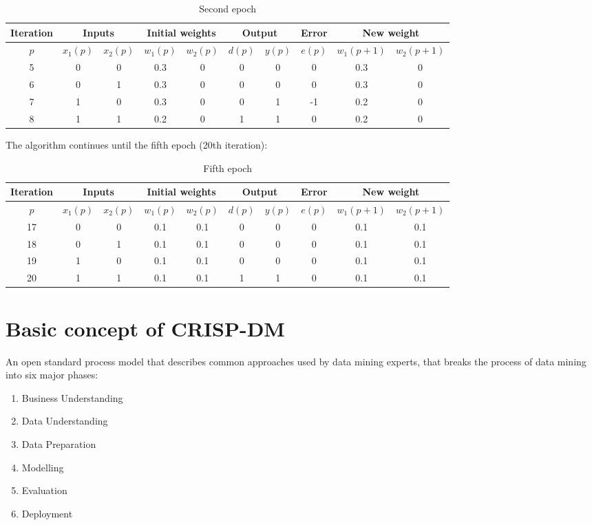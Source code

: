 \documentclass[a4paper,12pt,answers]{article}
\begin{document}
	\begin{table}[H]
		\centering
		\begin{tabular}{|c|c|c|c|c|c|c|c|c|c|}
			\hline
			Iteration & \multicolumn{2}{c|}{Inputs} & \multicolumn{2}{c|}{Initial weights} & \multicolumn{2}{c|}{Output} & Error & \multicolumn{2}{c|}{New weight} \\
			\hline
			$p$ & $x_1(p)$ & $x_2(p)$ & $w_1(p)$ & $w_2(p)$ &$d(p)$ & $y(p)$ & $e(p)$ & $w_1(p+1)$ & $w_2(p+1)$ \\ \hline
			5 & 0 & 0 & 0.3 & 0    & 0 & 0 & 0 & 0.3 & 0 \\
			6 & 0 & 1 & 0.3 & 0 & 0 & 0 & 0 & 0.3 & 0 \\
			7 & 1 & 0 & 0.3 & 0 & 0 & 1 & -1& 0.2 & 0 \\
			8 & 1 & 1 & 0.2 & 0 & 1 & 1 & 0 & 0.2 &  0 \\
			\hline
		\end{tabular}
		\caption{Second epoch}
	\end{table}
	\newpage
	\noindent
	The algorithm continues until the fifth epoch (20th iteration):
	\begin{table}[H]
		\centering
		\begin{tabular}{|c|c|c|c|c|c|c|c|c|c|}
			\hline
			Iteration & \multicolumn{2}{c|}{Inputs} & \multicolumn{2}{c|}{Initial weights} & \multicolumn{2}{c|}{Output} & Error & \multicolumn{2}{c|}{New weight} \\
			\hline
			$p$ & $x_1(p)$ & $x_2(p)$ & $w_1(p)$ & $w_2(p)$ &$d(p)$ & $y(p)$ & $e(p)$ & $w_1(p+1)$ & $w_2(p+1)$ \\ \hline
			17  & 0        & 0        & 0.1 & 0.1    & 0 & 0 & 0 & 0.1 & 0.1 \\
			18  & 0        & 1        & 0.1  & 0.1 & 0 & 0 & 0 & 0.1 & 0.1 \\
			19  & 1        & 0        & 0.1 & 0.1 & 0 & 0 & 0 & 0.1 & 0.1 \\
			20  & 1        & 1        & 0.1 & 0.1 & 1 & 1 & 0 & 0.1 & 0.1 \\
			\hline
		\end{tabular}
		\caption{Fifth epoch}
	\end{table}
	
	
	
	\newpage
	\section{Basic concept of CRISP-DM}
	An open standard process model that describes common approaches used by data mining experts, that breaks the process of data mining into six major phases:
	\begin{enumerate}
		\item Business Understanding
		\item Data Understanding
		\item Data Preparation
		\item Modelling
		\item Evaluation
		\item Deployment
	\end{enumerate}
\end{document}

